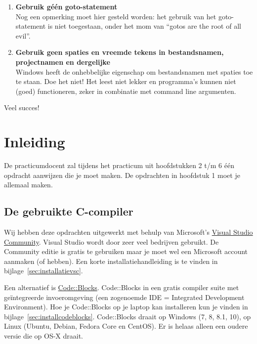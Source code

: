 \documentclass[a4paper,10pt,fleqn,twoside]{article}
\begin{document}
\begin{enumerate}[label=\textbf{\arabic*.}]
Als je niet begrijpt waar het programma fout gaat, steek dan niet direct je hand omhoog. Zet in je code op de plek waar het programma vermoedelijk nog correct werkt een \textsl{breakpoint}\footnote{In de les wordt uitgelegd hoe je dit moet doen.}. Als het programma tijdens het debuggen is gestopt op de plek van de breakpoint, controleer dan goed de inhoud van alle actuele variabelen. Dit is één van de krachtigste manieren om fouten te detecteren en om tot een werkend programma te komen.
\item \textbf{Gebruik géén goto-statement}\\
Nog een opmerking moet hier gesteld worden: het gebruik van het goto-statement is niet toegestaan, onder het mom van ``gotos are the root of all evil''.
\item \textbf{Gebruik geen spaties en vreemde tekens in bestandsnamen, projectnamen en dergelijke}\\
Windows heeft de onhebbelijke eigenschap om bestandsnamen met spaties toe te staan. Doe het niet! Het leest niet lekker en programma’s kunnen niet (goed) functioneren, zeker in combinatie met command line argumenten.
\end{enumerate}


Veel succes!



\section{Inleiding}

De practicumdocent zal tijdens het practicum uit hoofdstukken 2 t/m 6 één opdracht aanwijzen die je moet maken. De opdrachten in hoofdstuk 1 moet je allemaal maken. 

\subsection{De gebruikte C-compiler}
Wij hebben deze opdrachten uitgewerkt met behulp van Microsoft’s \href{https://visualstudio.microsoft.com/vs/community/}{Visual Studio Community}. Visual Studio wordt door zeer veel bedrijven gebruikt. De Community editie is gratis te gebruiken maar je moet wel een Microsoft account aanmaken (of hebben). Een korte installatiehandleiding is te vinden in bijlage~\ref{sec:installatievsc}.

Een alternatief is \href{http://www.codeblocks.org/}{Code::Blocks}. Code::Blocks in een gratis compiler suite met geïntegreerde invoeromgeving (een zogenoemde IDE = Integrated Development Environment). Hoe je Code::Blocks op je laptop kan installeren kun je vinden in bijlage~\ref{sec:installcodeblocks}. Code::Blocks draait op Windows (7, 8, 8.1, 10), op Linux (Ubuntu, Debian, Fedora Core en CentOS). Er is helaas alleen een oudere versie die op OS-X draait.
\end{document}
